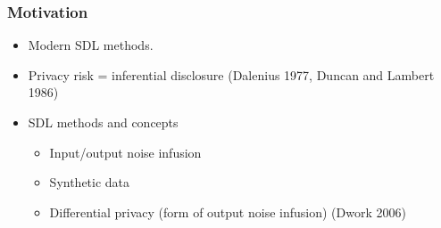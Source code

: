 \begin{frame}[allowframebreaks]%
\frametitle{Motivation}

\begin{itemize}
	\item Modern SDL methods. \vspace{.25in}
	\item Privacy risk = inferential disclosure (Dalenius 1977, Duncan and Lambert 1986) \vspace{.25in}
	\item SDL methods and concepts
	\begin{itemize}
		\item Input/output noise infusion
		\item Synthetic data
		\item Differential privacy (form of output noise infusion) (Dwork 2006)
	\end{itemize}

\end{itemize}



\end{frame}%
%





